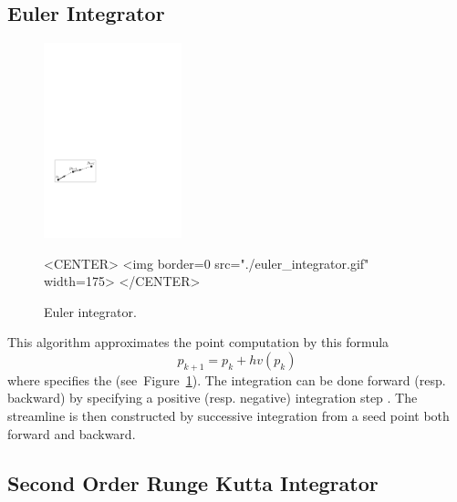 \subsection{Euler Integrator}

\begin{figure}[h!]
\begin{ccTexOnly}
\begin{center}
\includegraphics[width=4cm]{Stream_lines_2/euler_integrator}
\end{center}
\end{ccTexOnly}
\caption{Euler integrator.
\label{euler_fig}}
\begin{ccHtmlOnly}
<CENTER>
<img border=0 src="./euler_integrator.gif" width=175>
</CENTER>
\end{ccHtmlOnly}
\end{figure}

This algorithm approximates the point computation by this formula
$$p_{k+1} = p_k + hv(p_k)$$ where  specifies the
 (see~Figure~\ref{euler_fig}). The integration
can be done forward (resp. backward) by specifying a positive
(resp. negative) integration step . The streamline is then
constructed by successive integration from a seed point both forward
and backward.

\subsection{Second Order Runge Kutta Integrator}

